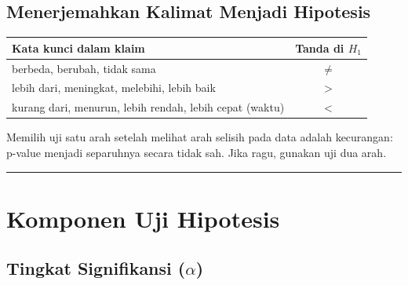 \documentclass[
  indonesian,
  letterpaper,
]{book}
\newcounter{none} %
\begin{document}
\section{Menerjemahkan Kalimat Menjadi
Hipotesis}\label{menerjemahkan-kalimat-menjadi-hipotesis}

{\def\LTcaptype{none} %
\begin{longtable}[]{@{}lc@{}}
\toprule\noalign{}
Kata kunci dalam klaim & Tanda di \(H_1\) \\
\midrule\noalign{}
\endhead
\bottomrule\noalign{}
\endlastfoot
berbeda, berubah, tidak sama & \(\neq\) \\
lebih dari, meningkat, melebihi, lebih baik & \(>\) \\
kurang dari, menurun, lebih rendah, lebih cepat (waktu) & \(<\) \\
\end{longtable}
}

\begin{tcolorbox}[enhanced jigsaw, arc=.35mm, bottomrule=.15mm, bottomtitle=1mm, breakable, colback=white, colbacktitle=quarto-callout-warning-color!10!white, colframe=quarto-callout-warning-color-frame, coltitle=black, left=2mm, leftrule=.75mm, opacityback=0, opacitybacktitle=0.6, rightrule=.15mm, title=\textcolor{quarto-callout-warning-color}{\faExclamationTriangle}\hspace{0.5em}{Tentukan arah sebelum melihat data}, titlerule=0mm, toprule=.15mm, toptitle=1mm]

Memilih uji satu arah setelah melihat arah selisih pada data adalah
kecurangan: p-value menjadi separuhnya secara tidak sah. Jika ragu,
gunakan uji dua arah.

\end{tcolorbox}

\begin{center}\rule{0.5\linewidth}{0.5pt}\end{center}


\chapter{Komponen Uji Hipotesis}\label{komponen-uji-hipotesis}

\section{\texorpdfstring{Tingkat Signifikansi
(\(\alpha\))}{Tingkat Signifikansi (\textbackslash alpha)}}\label{tingkat-signifikansi-alpha}
\end{document}
